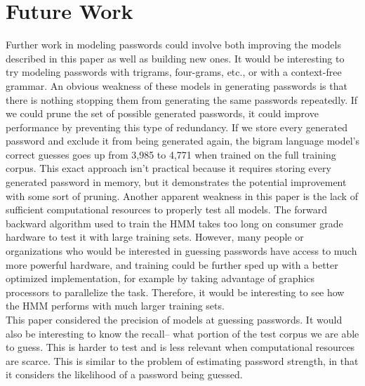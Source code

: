 \documentclass{amsart}
\theoremstyle{definition}
\theoremstyle{remark}
\numberwithin{equation}{section}
\begin{document}
\section{Future Work}
Further work in modeling passwords could involve both improving the models described in this paper as well as building new ones. It would be interesting to try modeling passwords with trigrams, four-grams, etc., or with a context-free grammar. An obvious weakness of these models in generating passwords is that there is nothing stopping them from generating the same passwords repeatedly. If we could prune the set of possible generated passwords, it could improve performance by preventing this type of redundancy. If we store every generated password and exclude it from being generated again, the bigram language model's correct guesses goes up from 3,985 to 4,771 when trained on the full training corpus. This exact approach isn't practical because it requires storing every generated password in memory, but it demonstrates the potential improvement with some sort of pruning. Another apparent weakness in this paper is the lack of sufficient computational resources to properly test all models. The forward backward algorithm used to train the HMM takes too long on consumer grade hardware to test it with large training sets. However, many people or organizations who would be interested in guessing passwords have access to much more powerful hardware, and training could be further sped up with a better optimized implementation, for example by taking advantage of graphics processors to parallelize the task. Therefore, it would be interesting to see how the HMM performs with much larger training sets.\\
This paper considered the precision of models at guessing passwords. It would also be interesting to know the recall-- what portion of the test corpus we are able to guess. This is harder to test and is less relevant when computational resources are scarce. This is similar to the problem of estimating password strength, in that it considers the likelihood of a password being guessed.
\end{document}
